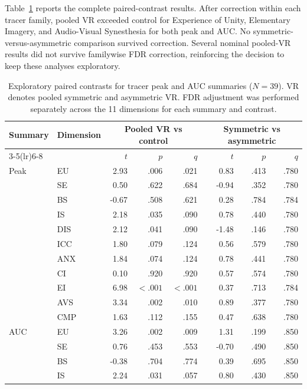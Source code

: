 \documentclass[pdflatex,sn-mathphys-num]{sn-jnl}
\begin{document}
Table~\ref{tab:supp_tracer_condition_contrasts} reports the complete paired-contrast results. After correction within each tracer family, pooled VR exceeded control for Experience of Unity, Elementary Imagery, and Audio-Visual Synesthesia for both peak and AUC. No symmetric-versus-asymmetric comparison survived correction. Several nominal pooled-VR results did not survive familywise FDR correction, reinforcing the decision to keep these analyses exploratory.

\begin{table}[!htbp]
\centering
\scriptsize
\caption{Exploratory paired contrasts for tracer peak and AUC summaries ($N=39$). VR denotes pooled symmetric and asymmetric VR. FDR adjustment was performed separately across the 11 dimensions for each summary and contrast.}
\label{tab:supp_tracer_condition_contrasts}
\begin{tabular}{@{}llrrrrrr@{}}
\toprule
Summary & Dimension & \multicolumn{3}{c}{Pooled VR vs control} & \multicolumn{3}{c}{Symmetric vs asymmetric} \\
\cmidrule(lr){3-5}\cmidrule(lr){6-8}
& & $t$ & $p$ & $q$ & $t$ & $p$ & $q$ \\
\midrule
Peak & EU  & 2.93 & .006 & .021 &  0.83 & .413 & .780 \\
     & SE  & 0.50 & .622 & .684 & -0.94 & .352 & .780 \\
     & BS  &-0.67 & .508 & .621 &  0.28 & .784 & .784 \\
     & IS  & 2.18 & .035 & .090 &  0.78 & .440 & .780 \\
     & DIS & 2.12 & .041 & .090 & -1.48 & .146 & .780 \\
     & ICC & 1.80 & .079 & .124 &  0.56 & .579 & .780 \\
     & ANX & 1.84 & .074 & .124 &  0.78 & .441 & .780 \\
     & CI  & 0.10 & .920 & .920 &  0.57 & .574 & .780 \\
     & EI  & 6.98 & $<.001$ & $<.001$ & 0.37 & .713 & .784 \\
     & AVS & 3.34 & .002 & .010 &  0.89 & .377 & .780 \\
     & CMP & 1.63 & .112 & .155 &  0.47 & .638 & .780 \\
\midrule
AUC  & EU  & 3.26 & .002 & .009 &  1.31 & .199 & .850 \\
     & SE  & 0.76 & .453 & .553 & -0.70 & .490 & .850 \\
     & BS  &-0.38 & .704 & .774 &  0.39 & .695 & .850 \\
     & IS  & 2.24 & .031 & .057 &  0.80 & .430 & .850 \\

\end{tabular}
\end{table}
\end{document}
